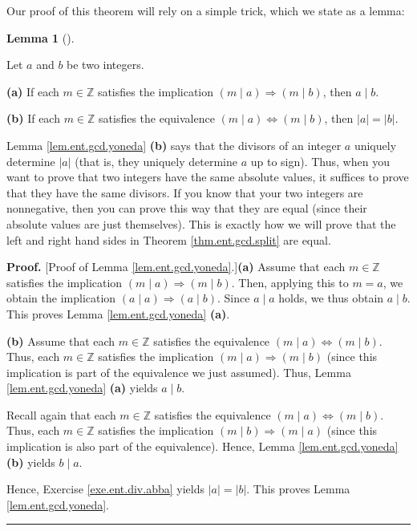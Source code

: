 \documentclass[numbers=enddot,12pt,final,onecolumn,notitlepage]{scrartcl}%
\numberwithin{exer}{subsection}
\theoremstyle{definition}
\newtheorem{lem}[theo]{Lemma}
\newenvironment{lemma}[1][]
{\begin{lem}[#1]\begin{leftbar}}
{\end{leftbar}\end{lem}}
\newenvironment{proof}[1][Proof]{\noindent\textbf{#1.} }{\ \rule{0.5em}{0.5em}}
\begin{document}
Our proof of this theorem will rely on a simple trick, which we state as a lemma:

\begin{lemma}
\label{lem.ent.gcd.yoneda}Let $a$ and $b$ be two integers.

\textbf{(a)} If each $m\in\mathbb{Z}$ satisfies the implication $\left(  m\mid
a\right)  \Longrightarrow\left(  m\mid b\right)  $, then $a\mid b$.

\textbf{(b)} If each $m\in\mathbb{Z}$ satisfies the equivalence $\left(  m\mid
a\right)  \Longleftrightarrow\left(  m\mid b\right)  $, then $\left\vert
a\right\vert =\left\vert b\right\vert $.
\end{lemma}

Lemma \ref{lem.ent.gcd.yoneda} \textbf{(b)} says that the divisors of an
integer $a$ uniquely determine $\left\vert a\right\vert $ (that is, they
uniquely determine $a$ up to sign). Thus, when you want to prove that two
integers have the same absolute values, it suffices to prove that they have
the same divisors. If you know that your two integers are nonnegative, then
you can prove this way that they are equal (since their absolute values are
just themselves). This is exactly how we will prove that the left and right
hand sides in Theorem \ref{thm.ent.gcd.split} are equal.

\begin{proof}
[Proof of Lemma \ref{lem.ent.gcd.yoneda}.]\textbf{(a)} Assume that each
$m\in\mathbb{Z}$ satisfies the implication $\left(  m\mid a\right)
\Longrightarrow\left(  m\mid b\right)  $. Then, applying this to $m=a$, we
obtain the implication $\left(  a\mid a\right)  \Longrightarrow\left(  a\mid
b\right)  $. Since $a\mid a$ holds, we thus obtain $a\mid b$. This proves
Lemma \ref{lem.ent.gcd.yoneda} \textbf{(a)}.

\textbf{(b)} Assume that each $m\in\mathbb{Z}$ satisfies the equivalence
$\left(  m\mid a\right)  \Longleftrightarrow\left(  m\mid b\right)  $. Thus,
each $m\in\mathbb{Z}$ satisfies the implication $\left(  m\mid a\right)
\Longrightarrow\left(  m\mid b\right)  $ (since this implication is part of
the equivalence we just assumed). Thus, Lemma \ref{lem.ent.gcd.yoneda}
\textbf{(a)} yields $a\mid b$.

Recall again that each $m\in\mathbb{Z}$ satisfies the equivalence $\left(
m\mid a\right)  \Longleftrightarrow\left(  m\mid b\right)  $. Thus, each
$m\in\mathbb{Z}$ satisfies the implication $\left(  m\mid b\right)
\Longrightarrow\left(  m\mid a\right)  $ (since this implication is also part
of the equivalence). Hence, Lemma \ref{lem.ent.gcd.yoneda} \textbf{(b)} yields
$b\mid a$.

Hence, Exercise \ref{exe.ent.div.abba} yields $\left\vert a\right\vert
=\left\vert b\right\vert $. This proves Lemma \ref{lem.ent.gcd.yoneda}.
\end{proof}
\end{document}
